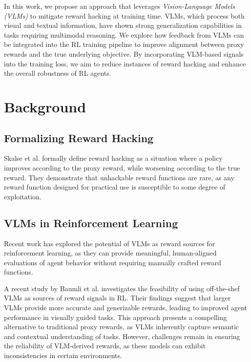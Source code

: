 \documentclass{article}
\begin{document}
In this work, we propose an approach that leverages \textit{Vision-Language Models (VLMs)} to mitigate reward hacking at training time. VLMs, which process both visual and textual information, have shown strong generalization capabilities in tasks requiring multimodal reasoning. We explore how feedback from VLMs can be integrated into the RL training pipeline to improve alignment between proxy rewards and the true underlying objective. By incorporating VLM-based signals into the training loss, we aim to reduce instances of reward hacking and enhance the overall robustness of RL agents.

\section{Background}
\subsection{Formalizing Reward Hacking}
Skalse et al. \cite{skalse2022definingcharacterizingrewardhacking} formally define reward hacking as a situation where a policy improves according to the proxy reward, while worsening according to the true reward. They demonstrate that unhackable reward functions are rare, as any reward function designed for practical use is susceptible to some degree of exploitation. 

\subsection{VLMs in Reinforcement Learning}
Recent work has explored the potential of VLMs as reward sources for reinforcement learning, as they can provide meaningful, human-aligned evaluations of agent behavior without requiring manually crafted reward functions.

A recent study by Baumli et al. \cite{baumli2024visionlanguagemodelssourcerewards} investigates the feasibility of using off-the-shef VLMs as sources of reward signals in RL. Their findings suggest that larger VLMs provide more accurate and generizable rewards, leading to improved agent performance in visually guided tasks. This approach presents a compelling alternative to traditional proxy rewards, as VLMs inherently capture semantic and contextual understanding of tasks. However, challenges remain in ensuring the reliability of VLM-derived rewards, as these models can exhibit inconsistencies in certain environments.
\end{document}

